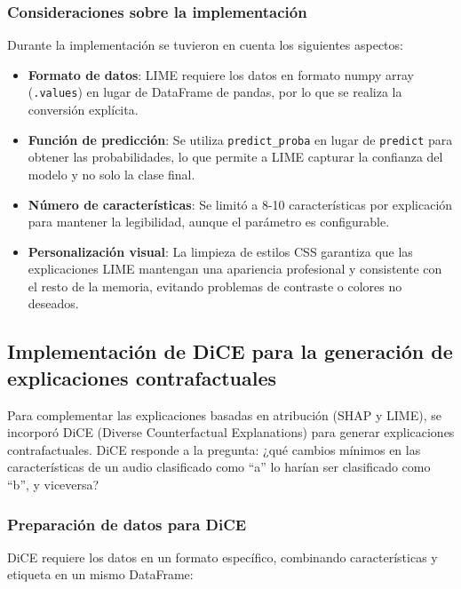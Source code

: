 \subsubsection*{Consideraciones sobre la implementación}

Durante la implementación se tuvieron en cuenta los siguientes aspectos:

\begin{itemize}
    \item \textbf{Formato de datos}: LIME requiere los datos en formato numpy array (\texttt{.values}) en lugar de DataFrame de pandas, por lo que se realiza la conversión explícita.
    
    \item \textbf{Función de predicción}: Se utiliza \texttt{predict\_proba} en lugar de \texttt{predict} para obtener las probabilidades, lo que permite a LIME capturar la confianza del modelo y no solo la clase final.
    
    \item \textbf{Número de características}: Se limitó a 8-10 características por explicación para mantener la legibilidad, aunque el parámetro es configurable.
    
    \item \textbf{Personalización visual}: La limpieza de estilos CSS garantiza que las explicaciones LIME mantengan una apariencia profesional y consistente con el resto de la memoria, evitando problemas de contraste o colores no deseados.
\end{itemize}

\subsection*{Implementación de DiCE para la generación de explicaciones contrafactuales}

Para complementar las explicaciones basadas en atribución (SHAP y LIME), se incorporó DiCE (Diverse Counterfactual Explanations) para generar explicaciones contrafactuales. DiCE responde a la pregunta: ¿qué cambios mínimos en las características de un audio clasificado como ``a'' lo harían ser clasificado como ``b'', y viceversa?

\subsubsection*{Preparación de datos para DiCE}

DiCE requiere los datos en un formato específico, combinando características y etiqueta en un mismo DataFrame:

